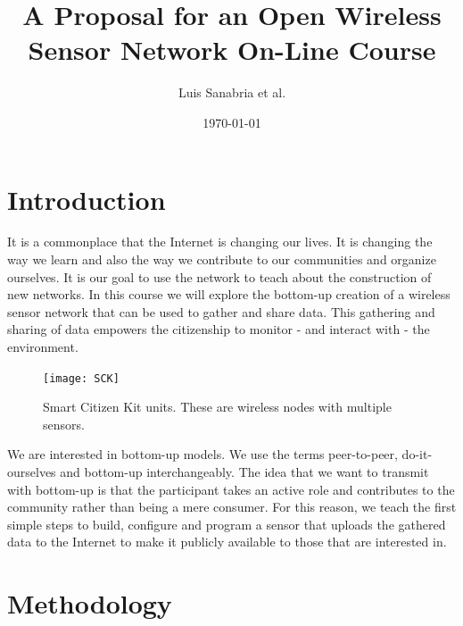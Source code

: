 \documentclass[oneside]{book}   %
\begin{document}
\title{A Proposal for an  Open Wireless Sensor Network On-Line Course} %
\author{Luis Sanabria et al.} %
\date{\today}    %
\maketitle





\maketitle %

\chapter{Introduction} %

It is a commonplace that the Internet is changing our lives.
It is changing the way we learn and also the way we contribute to our communities and organize ourselves.
It is our goal to use the network to teach about the construction of new networks.
In this course we will explore the bottom-up creation of a wireless sensor network that can be used to gather and share data.
This gathering and sharing of data empowers the citizenship to monitor - and interact with - the environment.

\begin{figure}
\begin{center}
\texttt{[image: SCK]}
\caption{Smart Citizen Kit units. These are wireless nodes with multiple sensors.}
\label{fig:SCK}
\end{center}
\end{figure}

We are interested in bottom-up models.
We use the terms peer-to-peer, do-it-ourselves and bottom-up interchangeably.
The idea that we want to transmit with bottom-up is that the participant takes an active role and contributes to the community rather than being a mere consumer.
For this reason, we teach the first simple steps to build, configure and program a sensor that uploads the gathered data to the Internet to make it publicly available to those that are interested in.


\chapter{Methodology}
\end{document}
